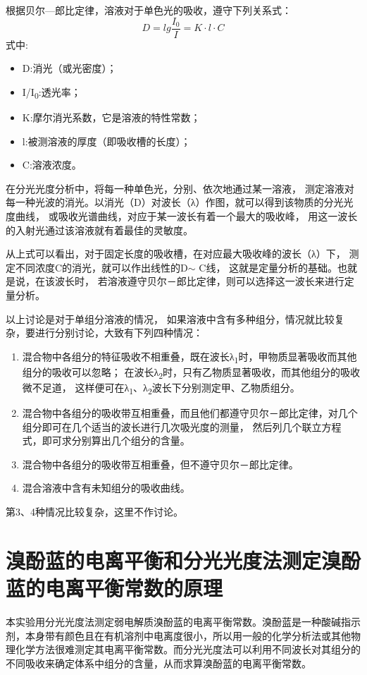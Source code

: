 \documentclass[11pt]{report}
\begin{document}
根据贝尔—郎比定律，溶液对于单色光的吸收，遵守下列关系式：
\[
   D=lg\frac{I_{0}}{I}=K\cdot l\cdot C
   \]
式中:
\begin{itemize}
\item D:消光（或光密度）；
\item I/I\textsubscript{0}:透光率；
\item K:摩尔消光系数，它是溶液的特性常数；
\item l:被测溶液的厚度（即吸收槽的长度）；
\item C:溶液浓度。
\end{itemize}

在分光光度分析中，将每一种单色光，分别、依次地通过某一溶液，
测定溶液对每一种光波的消光。以消光（D）对波长（λ）作图，就可以得到该物质的分光光度曲线，
或吸收光谱曲线，对应于某一波长有着一个最大的吸收峰，
用这一波长的入射光通过该溶液就有着最佳的灵敏度。

从上式可以看出，对于固定长度的吸收槽，在对应最大吸收峰的波长（λ）下，
测定不同浓度C的消光，就可以作出线性的D\(\sim\) C线，
这就是定量分析的基础。也就是说，在该波长时，
若溶液遵守贝尔－郎比定律，则可以选择这一波长来进行定量分析。

以上讨论是对于单组分溶液的情况，
如果溶液中含有多种组分，情况就比较复杂，要进行分别讨论，大致有下列四种情况：

\begin{enumerate}
\item 混合物中各组分的特征吸收不相重叠，既在波长λ\textsubscript{1}时，甲物质显著吸收而其他组分的吸收可以忽略；
在波长λ\textsubscript{2}时，只有乙物质显著吸收，而其他组分的吸收微不足道，
这样便可在λ\textsubscript{1}、λ\textsubscript{2}波长下分别测定甲、乙物质组分。
\item 混合物中各组分的吸收带互相重叠，而且他们都遵守贝尔－郎比定律，对几个组分即可在几个适当的波长进行几次吸光度的测量，
然后列几个联立方程式，即可求分别算出几个组分的含量。
\item 混合物中各组分的吸收带互相重叠，但不遵守贝尔－郎比定律。
\item 混合溶液中含有未知组分的吸收曲线。
\end{enumerate}

第3、4种情况比较复杂，这里不作讨论。
\chapter{溴酚蓝的电离平衡和分光光度法测定溴酚蓝的电离平衡常数的原理}
\label{sec:orgb0d5771}
本实验用分光光度法测定弱电解质溴酚蓝的电离平衡常数。溴酚蓝是一种酸碱指示剂，本身带有颜色且在有机溶剂中电离度很小，所以用一般的化学分析法或其他物理化学方法很难测定其电离平衡常数。而分光光度法可以利用不同波长对其组分的不同吸收来确定体系中组分的含量，从而求算溴酚蓝的电离平衡常数。
\end{document}

